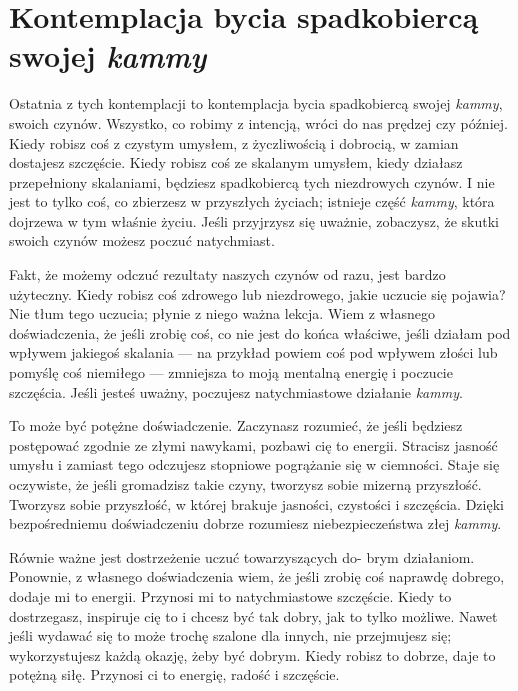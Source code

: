\documentclass[12pt,openany]{book}
\begin{document}
\section*{Kontemplacja bycia spadkobiercą swojej \textit{kammy}}

Ostatnia z tych kontemplacji to kontemplacja bycia spadkobiercą swojej \textit{kammy}, swoich czynów. Wszystko, co robimy z intencją, wróci do nas prędzej czy później. Kiedy robisz coś z czystym umysłem, z życzliwością i dobrocią, w zamian dostajesz szczęście. \linebreak Kiedy robisz coś ze skalanym umysłem, kiedy działasz przepełniony skalaniami, będziesz spadkobiercą tych niezdrowych czynów. I nie jest to tylko coś, co zbierzesz w przyszłych życiach; istnieje część \textit{kammy}, która dojrzewa w tym właśnie życiu. Jeśli przyjrzysz się uważnie, zobaczysz, że skutki swoich czynów możesz poczuć natychmiast.

Fakt, że możemy odczuć rezultaty naszych czynów od razu, jest bardzo użyteczny. Kiedy robisz coś zdrowego lub nie\-zdro\-we\-go, jakie uczucie się pojawia? Nie tłum tego uczucia; płynie z niego ważna lekcja. Wiem z własnego doświadczenia, że jeśli zrobię coś, co nie jest do końca właściwe, jeśli działam pod wpływem jakiegoś skalania --- na przykład powiem coś pod wpływem złości lub pomyślę coś niemiłego --- zmniejsza to moją mentalną energię i poczucie szczęścia. Jeśli jesteś uważny, poczujesz natychmiastowe działanie \textit{kammy}.

To może być potężne doświadczenie. Zaczynasz rozumieć, że jeśli będziesz postępować zgodnie ze złymi nawykami, pozbawi cię to energii. Stracisz jasność umysłu i zamiast tego odczujesz stopniowe pogrążanie się w ciemności. Staje się oczywiste, że jeśli gromadzisz takie czyny, tworzysz sobie mizerną przyszłość. Tworzysz sobie przyszłość, w której brakuje jasności, czystości i szczęścia. Dzięki bezpośredniemu doświadczeniu dobrze rozumiesz niebezpieczeństwa złej \textit{kammy}.

Równie ważne jest dostrzeżenie uczuć towarzyszących do- \linebreak brym działaniom. Ponownie, z własnego doświadczenia wiem, że jeśli zrobię coś naprawdę dobrego, dodaje mi to energii. Przynosi mi to natychmiastowe szczęście.  Kiedy to dostrzegasz, inspiruje cię to i chcesz być tak dobry, jak to tylko możliwe. Nawet jeśli wydawać się to może trochę szalone dla innych, nie przejmujesz się; wykorzystujesz każdą okazję, żeby być dobrym. Kiedy robisz to dobrze, daje to potężną siłę. Przynosi ci to energię, radość i szczęście.
\end{document}
